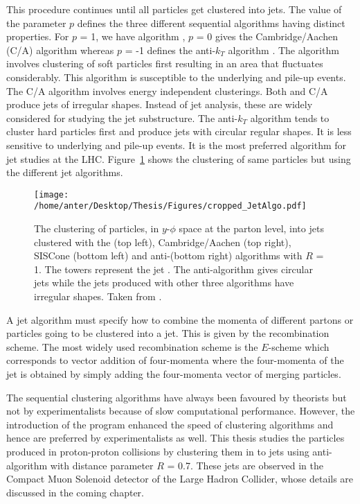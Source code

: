 This procedure continues until all particles get clustered into jets. The value of the parameter $p$ defines the three different sequential algorithms having distinct properties. For $p$ = 1, we have \kt algorithm \cite{Catani:1993hr,Catani:1992zp}, $p$ = 0 gives the Cambridge/Aachen (C/A) algorithm \cite{Dokshitzer:1997in} whereas $p$ = -1 defines the anti-$k_{T}$ algorithm \cite{Cacciari:2008gp}. The \kt algorithm involves clustering of soft particles first resulting in an area that fluctuates considerably. This algorithm is susceptible to the underlying and pile-up events. The C/A algorithm involves energy independent clusterings. Both \kt and C/A produce jets of irregular shapes. Instead of jet analysis, these are widely considered for studying the jet substructure. The anti-$k_{T}$ algorithm tends to cluster hard particles first and produce jets with circular regular shapes. It is less sensitive to underlying and pile-up events. It is the most preferred algorithm for jet studies at the LHC. Figure~\ref{fig:jet_algo} shows the clustering of same particles but using the different jet algorithms. 

\begin{figure}[!h]
\begin{center}
\hspace*{-15mm}
\texttt{[image: /home/anter/Desktop/Thesis/Figures/cropped\_JetAlgo.pdf]}\\
\vspace*{4mm}
\caption[The clustering of particles into jets using different jet algorithms.]{The clustering of particles, in $y$-$\phi$ space at the parton level, into jets clustered with the \kt (top left), Cambridge/Aachen (top right), SISCone (bottom left) and anti-\kt (bottom right) algorithms with $R$ = 1. The towers represent the jet \pt. The anti-\kt algorithm gives circular jets while the jets produced with other three algorithms have irregular shapes. Taken from \cite{Salam:2009jx}.}
\label{fig:jet_algo}
\end{center}
\end{figure}

A jet algorithm must specify how to combine the momenta of different partons or particles going to be clustered into a jet. This is given by the recombination scheme. The most widely used recombination scheme is the $E$-scheme \cite{Blazey:2000qt} which corresponds to vector addition of four-momenta where the four-momenta of the jet is obtained by simply adding the four-momenta vector of merging particles.
 
The sequential clustering algorithms have always been favoured by theorists but not by experimentalists because of slow computational performance. However, the introduction of the \fastjet program \cite{Cacciari:2011ma} enhanced the speed of clustering algorithms and hence are preferred by experimentalists as well. This thesis studies the particles produced in proton-proton collisions by clustering them in to jets using anti-\kt algorithm with distance parameter $R$ = 0.7. These jets are observed in the Compact Muon Solenoid detector of the Large Hadron Collider, whose details are discussed in the coming chapter.

